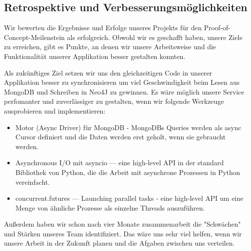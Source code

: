 \subsection{Retrospektive und Verbesserungsmöglichkeiten}
Wir bewerten die Ergebnisse und Erfolge unseres Projekts für den Proof-of-Concept-Meilenstein als erfolgreich. Obwohl wir es geschafft haben, unsere Ziele zu erreichen, gibt es Punkte, an denen wir unsere Arbeitsweise und die Funktionalität unserer Applikation besser gestalten konnten.

Als zukünftiges Ziel setzen wir uns den gleichzeitigen Code in unserer Applikation besser zu synchronisieren um viel Geschwindigkeit beim Lesen aus MongoDB und Schreiben in Neo4J zu gewinnen. Es wäre möglich unsere Service perfomanter und zuverlässiger zu gestalten, wenn wir folgende Werkzeuge ausprobieren und implementieren:
\begin{itemize}
    \item Motor (Async Driver) für MongoDB - MongoDBs Queries werden als async Cursor definiert und die Daten werden erst geholt, wenn sie gebraucht werden. \cite{motordocs}
    \item Asynchronous I/O mit asyncio — eine high-level API in der standard Bibliothek von Python, die die Arbeit mit asynchrone Prozessen in Python vereinfacht. \cite{asynciodocs}
    \item concurrent.futures — Launching parallel tasks - eine high-level API um eine Menge von ähnliche Prozesse als einzelne Threads auszuführen. \cite{concurrentpythondocs}
\end{itemize}
Außerdem haben wir schon nach vier Monate zusammenarbeit die "Schwächen" und Stärken unseres Team identifiziert. Das wäre uns sehr viel helfen, wenn wir unsere Arbeit in der Zukunft planen und die Afgaben zwischen uns verteilen.

